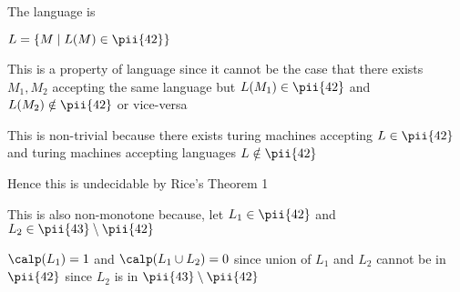 
The language is 

$
L = \{
    M \mid L(M) \in \pii{42}
\}
$

This is a property of language since it cannot be the case that there exists $M_1, M_2$ accepting the same language but $L(M_1) \in \pii{42}$ and $L(M_2) \notin \pii{42}$ or vice-versa

This is non-trivial because there exists turing machines accepting $L \in \pii{42}$ and turing machines accepting languages $L \notin \pii{42}$

Hence this is undecidable by Rice's Theorem 1

This is also non-monotone because, let $L_1 \in \pii{42}$ and 
$L_2 \in \pii{43} \setminus \pii{42}$ 

$\calp(L_1) = 1$ and $\calp(L_1 \cup L_2) = 0$ since union of $L_1$ and $L_2$ cannot be in $\pii{42}$ since $L_2$ is in $\pii{43} \setminus \pii{42}$


















